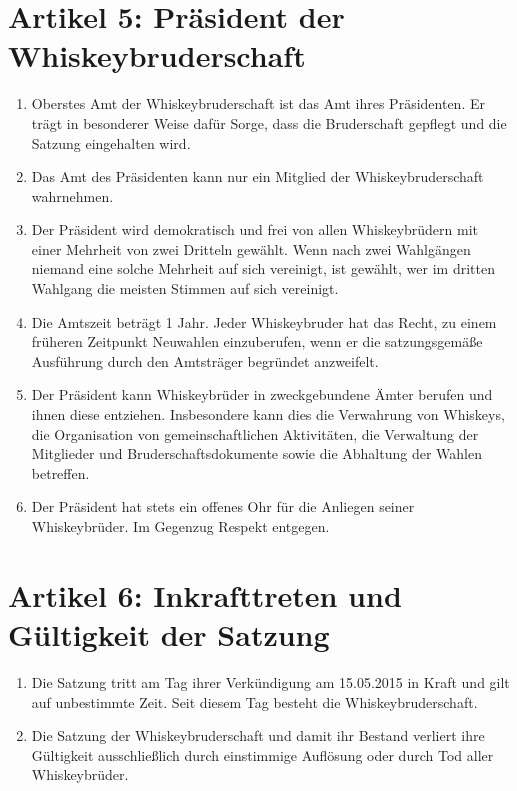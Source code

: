 \documentclass[a4paper,12pt]{article}
\begin{document}
\section*{Artikel 5: Präsident der Whiskeybruderschaft}

\begin{enumerate}

\item Oberstes Amt der Whiskeybruderschaft ist das Amt ihres Präsidenten. Er trägt in besonderer
  Weise dafür Sorge, dass die Bruderschaft gepflegt und die Satzung eingehalten wird.

\item Das Amt des Präsidenten kann nur ein Mitglied der Whiskeybruderschaft wahrnehmen.

\item Der Präsident wird demokratisch und frei von allen Whiskeybrüdern mit einer Mehrheit von zwei
  Dritteln gewählt. Wenn nach zwei Wahlgängen niemand eine solche Mehrheit auf sich vereinigt, ist
  gewählt, wer im dritten Wahlgang die meisten Stimmen auf sich vereinigt.

\item Die Amtszeit beträgt 1 Jahr. Jeder Whiskeybruder hat das Recht, zu einem früheren Zeitpunkt
  Neuwahlen einzuberufen, wenn er die satzungsgemäße Ausführung durch den Amtsträger begründet
  anzweifelt.

\item Der Präsident kann Whiskeybrüder in zweckgebundene Ämter berufen und ihnen diese entziehen.
  Insbesondere kann dies die Verwahrung von Whiskeys, die Organisation von gemeinschaftlichen
  Aktivitäten, die Verwaltung der Mitglieder und Bruderschaftsdokumente sowie die Abhaltung der
  Wahlen betreffen.

\item Der Präsident hat stets ein offenes Ohr für die Anliegen seiner Whiskeybrüder. Im Gegenzug
  Respekt entgegen.

\end{enumerate}



\section*{Artikel 6: Inkrafttreten und Gültigkeit der Satzung}

\begin{enumerate}

\item Die Satzung tritt am Tag ihrer Verkündigung am 15.05.2015 in Kraft und gilt auf unbestimmte
  Zeit. Seit diesem Tag besteht die Whiskeybruderschaft.

\item Die Satzung der Whiskeybruderschaft und damit ihr Bestand verliert ihre Gültigkeit
  ausschließlich durch einstimmige Auflösung oder durch Tod aller Whiskeybrüder.

\end{enumerate}
\end{document}
